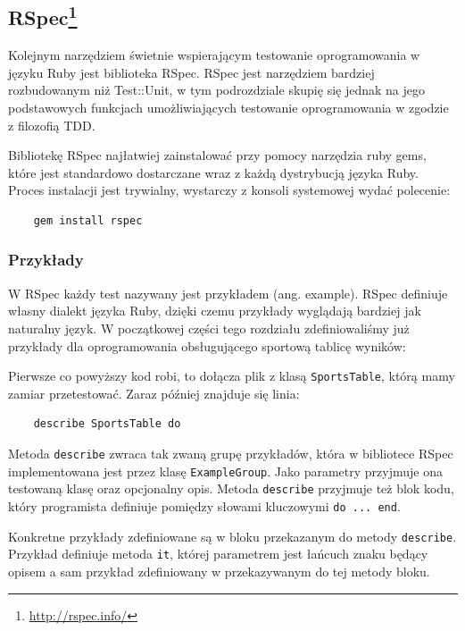     \subsection[RSpec]{RSpec\footnote{\url{http://rspec.info/}\nocite{rspec}}}
    
    Kolejnym narzędziem świetnie wspierającym testowanie oprogramowania w języku Ruby jest biblioteka RSpec. RSpec jest narzędziem bardziej rozbudowanym niż Test::Unit, w tym podrozdziale skupię się jednak na jego podstawowych funkcjach umożliwiających testowanie oprogramowania w zgodzie z filozofią TDD.
    
    Bibliotekę RSpec najłatwiej zainstalować przy pomocy narzędzia ruby gems, które jest standardowo dostarczane wraz z każdą dystrybucją języka Ruby. Proces instalacji jest trywialny, wystarczy z konsoli systemowej wydać polecenie:
    
    \begin{lstlisting}
    gem install rspec
    \end{lstlisting}
    
    \subsubsection{Przykłady}
    W RSpec każdy test nazywany jest przykładem (ang. example). RSpec definiuje własny dialekt języka Ruby, dzięki czemu przykłady wyglądają bardziej jak naturalny język. W początkowej części tego rozdziału zdefiniowaliśmy już przykłady dla oprogramowania obsługującego sportową tablicę wyników:
    
    
    
    Pierwsze co powyższy kod robi, to dołącza plik z klasą \verb+SportsTable+, którą mamy zamiar przetestować. Zaraz później znajduje się linia:
    
    \begin{lstlisting}
    describe SportsTable do
    \end{lstlisting}
    
    Metoda \verb+describe+ zwraca tak zwaną grupę przykładów, która w bibliotece RSpec implementowana jest przez klasę \verb+ExampleGroup+. Jako parametry przyjmuje ona testowaną klasę oraz opcjonalny opis. Metoda \verb+describe+ przyjmuje też blok kodu, który programista definiuje pomiędzy słowami kluczowymi \verb+do ... end+.
    
    Konkretne przykłady zdefiniowane są w bloku przekazanym do metody \verb+describe+. Przykład definiuje metoda \verb+it+, której parametrem jest łańcuch znaku będący opisem a sam przykład zdefiniowany w przekazywanym do tej metody bloku.
    
